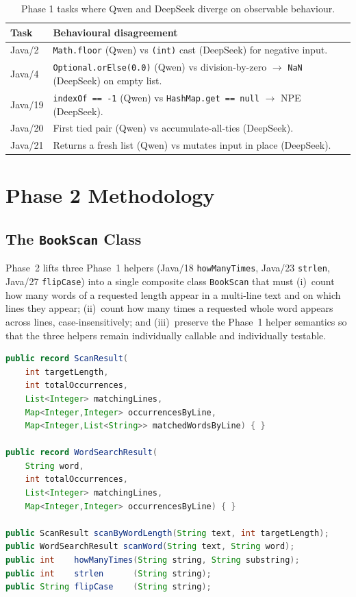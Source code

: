 \documentclass[journal]{IEEEtran}
\begin{document}
\begin{table}[!t]
\renewcommand{\arraystretch}{1.15}
\caption{Phase 1 tasks where Qwen and DeepSeek diverge on observable behaviour.}
\label{tab:divergence}
\centering
\footnotesize
\begin{tabular}{@{}lp{14.0cm}@{}}
\toprule
\textbf{Task} & \textbf{Behavioural disagreement} \\
\midrule
Java/2  & \texttt{Math.floor} (Qwen) vs \texttt{(int)} cast (DeepSeek) for negative input. \\
Java/4  & \texttt{Optional.orElse(0.0)} (Qwen) vs division-by-zero \(\to\) \texttt{NaN} (DeepSeek) on empty list. \\
Java/19 & \texttt{indexOf == -1} (Qwen) vs \texttt{HashMap.get == null} \(\to\) NPE (DeepSeek). \\
Java/20 & First tied pair (Qwen) vs accumulate-all-ties (DeepSeek). \\
Java/21 & Returns a fresh list (Qwen) vs mutates input in place (DeepSeek). \\
\bottomrule
\end{tabular}
\end{table}

\section{Phase 2 Methodology}\label{sec:phase2-method}

\subsection{The \texttt{BookScan} Class}

Phase~2 lifts three Phase~1 helpers (Java/18 \texttt{howManyTimes}, Java/23
\texttt{strlen}, Java/27 \texttt{flipCase}) into a single composite class
\texttt{BookScan} that must (i)~count how many words of a requested length
appear in a multi-line text and on which lines they appear; (ii)~count how
many times a requested whole word appears across lines, case-insensitively;
and (iii)~preserve the Phase~1 helper semantics so that the three helpers
remain individually callable and individually testable.

\begin{lstlisting}[language=Java, caption=Public surface of the final BookScan class.]
public record ScanResult(
    int targetLength,
    int totalOccurrences,
    List<Integer> matchingLines,
    Map<Integer,Integer> occurrencesByLine,
    Map<Integer,List<String>> matchedWordsByLine) { }

public record WordSearchResult(
    String word,
    int totalOccurrences,
    List<Integer> matchingLines,
    Map<Integer,Integer> occurrencesByLine) { }

public ScanResult scanByWordLength(String text, int targetLength);
public WordSearchResult scanWord(String text, String word);
public int    howManyTimes(String string, String substring);
public int    strlen      (String string);
public String flipCase    (String string);
\end{lstlisting}
\end{document}
